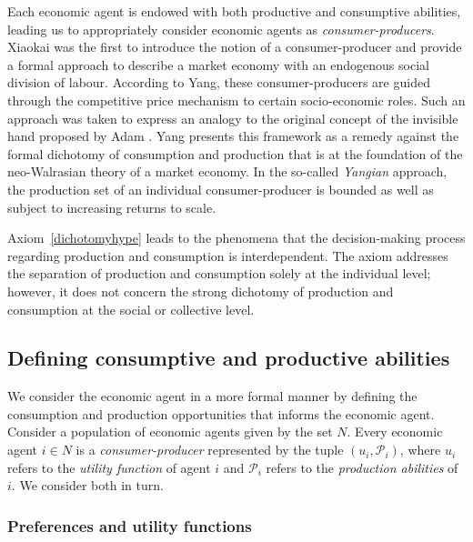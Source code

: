 Each economic agent is endowed with both productive and consumptive abilities, leading us to appropriately consider economic agents as \emph{consumer-producers}. Xiaokai \citet{Yang1988, Yang2001} was the first to introduce the notion of a consumer-producer and provide a formal approach to describe a market economy with an endogenous social division of labour. According to Yang, these consumer-producers are guided through the competitive price mechanism to certain socio-economic roles. Such an approach was taken to express an analogy to the original concept of the invisible hand proposed by Adam \citet{Smith1776}. Yang presents this framework as a remedy against the formal dichotomy of consumption and production that is at the foundation of the neo-Walrasian theory of a market economy. In the so-called \emph{Yangian} approach, the production set of an individual consumer-producer is bounded as well as subject to increasing returns to scale.

Axiom~\ref{dichotomyhype} leads to the phenomena that the decision-making process regarding production and consumption is interdependent. The axiom addresses the separation of production and consumption solely at the individual level; however, it does not concern the strong dichotomy of production and consumption at the social or collective level.

\subsection{Defining consumptive and productive abilities}

We consider the economic agent in a more formal manner by defining the consumption and production opportunities that informs the economic agent. Consider a population of economic agents given by the set $N$. Every economic agent $i \in N$ is a \emph{consumer-producer} represented by the tuple $\left( u_{i}, \mathcal{P}_{i} \right)$, where $u_{i}$ refers to the \emph{utility function} of agent $i$ and $\mathcal{P}_{i}$ refers to the \emph{production abilities} of $i$. We consider both in turn.

\subsubsection{Preferences and utility functions}

